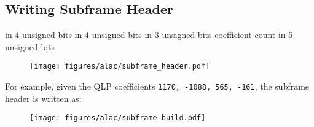 \subsection{Writing Subframe Header}
 in 4 unsigned bits
 in 4 unsigned bits
 in 3 unsigned bits
\WRITE coefficient count in 5 unsigned bits\;
\EALGORITHM
\begin{figure}[h]
\texttt{[image: figures/alac/subframe\_header.pdf]}
\end{figure}
\par
\noindent
For example, given the QLP coefficients
\texttt{1170, -1088, 565, -161},
the subframe header is written as:
\begin{figure}[h]
\texttt{[image: figures/alac/subframe-build.pdf]}
\end{figure}
